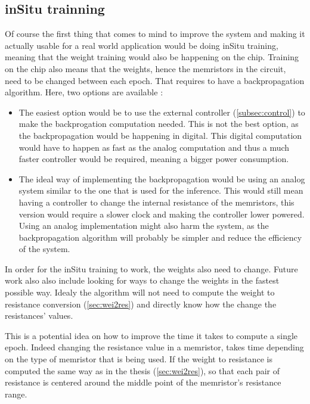 \subsection{inSitu trainning}\label{subsec:inSitu}

Of course the first thing that comes to mind to improve the system and making it actually usable for a real world application would be doing inSitu training, meaning that the weight training would also be happening on the chip. Training on the chip also means that the weights, hence the memristors in the circuit, need to be changed between each epoch. That requires to have a backpropagation algorithm. Here, two options are available :

\begin{itemize}
  \item The easiest option would be to use the external controller (\cref{subsec:control}) to make the backprogation computation needed. This is not the best option, as the backpropagation would be happening in digital. This digital computation would have to happen as fast as the analog computation and thus a much faster controller would be required, meaning a bigger power consumption.
  \item The ideal way of implementing the backpropagation would be using an analog system similar to the one that is used for the inference. This would still mean having a controller to change the internal resistance of the memristors, this version would require a slower clock and making the controller lower powered. Using an analog implementation might also harm the system, as the backpropagation algorithm will probably be simpler and reduce the efficiency of the system.
\end{itemize}

In order for the inSitu training to work, the weights also need to change. Future work also also include looking for ways to change the weights in the fastest possible way. Idealy the algorithm will not need to compute the weight to resistance conversion (\cref{sec:wei2res}) and directly know how the change the resistances' values.

This is a potential idea on how to improve the time it takes to compute a single epoch. Indeed changing the resistance value in a memristor, takes time depending on the type of memristor that is being used. If the weight to resistance is computed the same way as in the thesis (\cref{sec:wei2res}), so that each pair of resistance is centered around the middle point of the memristor's resistance range.

